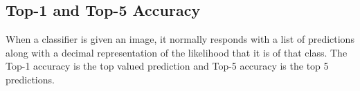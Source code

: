 
		





\tocless\subsection{Top-1 and Top-5 Accuracy}
When a classifier is given an image, it normally responds with a list of
predictions along with a decimal representation of the likelihood that it is of
that class. The Top-1 accuracy is the top valued prediction and Top-5 accuracy
is the top 5 predictions.


